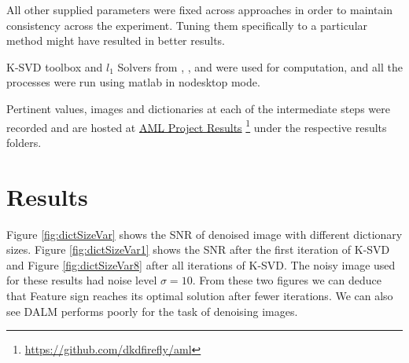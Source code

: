 \documentclass{article} %
\begin{document}
All other supplied parameters were fixed across approaches in order to maintain consistency across the experiment. Tuning them specifically to a particular method might have resulted in better results.

K-SVD toolbox \citep{rubinstein2008efficient} and $l_1$ Solvers from  \citep{yang2010fast}, \citep{lee2007efficient}, \citep{donoho2005sparselab} and \citep{l1lskim2007efficient} were used for computation, and all the processes were run using matlab in nodesktop mode.

Pertinent values, images and dictionaries at each of the intermediate steps were recorded and are hosted at \href{https://github.com/dkdfirefly/aml}{AML Project Results} \footnote{\url{https://github.com/dkdfirefly/aml}} under the respective results folders.


\section{Results}


Figure \ref{fig:dictSizeVar} shows the SNR of denoised image with different dictionary sizes. Figure \ref{fig:dictSizeVar1} shows the SNR after the first iteration of K-SVD and Figure \ref{fig:dictSizeVar8} after all iterations of K-SVD. The noisy image used for these results had noise level $\sigma = 10$. From these two figures we can deduce that Feature sign reaches its optimal solution after fewer iterations. We can also see DALM performs poorly for the task of denoising images. 
\end{document}
